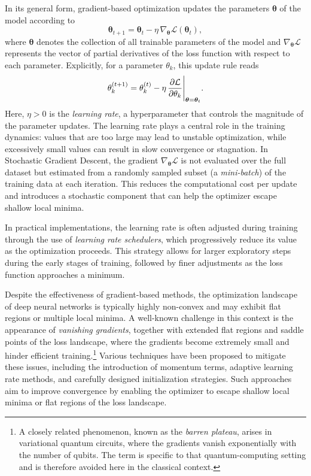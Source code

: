 In its general form, gradient-based optimization updates the parameters $\boldsymbol{\theta}$ of the model according to
\begin{equation}
    \boldsymbol{\theta}_{t+1} = \boldsymbol{\theta}_t - \eta \, \nabla_{\boldsymbol{\theta}} \mathcal{L}(\boldsymbol{\theta}_t),
\end{equation}
where $\boldsymbol{\theta}$ denotes the collection of all trainable parameters of the model and $\nabla_{\boldsymbol{\theta}} \mathcal{L}$ represents the vector of partial derivatives of the loss function with respect to each parameter. Explicitly, for a parameter $\theta_k$, this update rule reads
\begin{equation}
    \theta_k^{(t+1)} = \theta_k^{(t)} - \eta \, \pdv{\mathcal{L}}{\theta_k}\Bigg|_{\boldsymbol{\theta} = \boldsymbol{\theta}_t}.
\end{equation}
Here, $\eta > 0$ is the \emph{learning rate}, a hyperparameter that controls the magnitude of the parameter updates. The learning rate plays a central role in the training dynamics: values that are too large may lead to unstable optimization, while excessively small values can result in slow convergence or stagnation. In Stochastic Gradient Descent, the gradient $\nabla_{\boldsymbol{\theta}}\mathcal{L}$ is not evaluated over the full dataset but estimated from a randomly sampled subset (a \emph{mini-batch}) of the training data at each iteration. This reduces the computational cost per update and introduces a stochastic component that can help the optimizer escape shallow local minima.

In practical implementations, the learning rate is often adjusted during training through the use of \emph{learning rate schedulers}, which progressively reduce its value as the optimization proceeds. This strategy allows for larger exploratory steps during the early stages of training, followed by finer adjustments as the loss function approaches a minimum.

Despite the effectiveness of gradient-based methods, the optimization landscape of deep neural networks is typically highly non-convex and may exhibit flat regions or multiple local minima. A well-known challenge in this context is the appearance of \emph{vanishing gradients}, together with extended flat regions and saddle points of the loss landscape, where the gradients become extremely small and hinder efficient training.\footnote{A closely related phenomenon, known as the \emph{barren plateau}, arises in variational quantum circuits, where the gradients vanish exponentially with the number of qubits. The term is specific to that quantum-computing setting and is therefore avoided here in the classical context.} Various techniques have been proposed to mitigate these issues, including the introduction of momentum terms, adaptive learning rate methods, and carefully designed initialization strategies. Such approaches aim to improve convergence by enabling the optimizer to escape shallow local minima or flat regions of the loss landscape.

